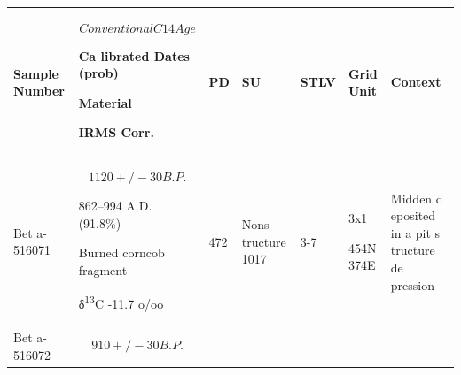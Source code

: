 \documentclass[
  12pt,
]{krantz}
\begin{document}
\begin{longtable}[]{@{}lllllll@{}}
\toprule
\begin{minipage}[b]{0.12\columnwidth}\raggedright
Sample
Number\strut
\end{minipage} & \begin{minipage}[b]{0.12\columnwidth}\raggedright
\[Conv
entional
C14
Age\]

Ca
librated
Dates
(prob)

Material

IRMS
Corr.\strut
\end{minipage} & \begin{minipage}[b]{0.07\columnwidth}\raggedright
PD\strut
\end{minipage} & \begin{minipage}[b]{0.12\columnwidth}\raggedright
SU\strut
\end{minipage} & \begin{minipage}[b]{0.08\columnwidth}\raggedright
STLV\strut
\end{minipage} & \begin{minipage}[b]{0.12\columnwidth}\raggedright
Grid
Unit\strut
\end{minipage} & \begin{minipage}[b]{0.12\columnwidth}\raggedright
Context\strut
\end{minipage}\tabularnewline
\midrule
\endhead
\begin{minipage}[t]{0.12\columnwidth}\raggedright
Bet
a-516071\strut
\end{minipage} & \begin{minipage}[t]{0.12\columnwidth}\raggedright
\[1120
+/- 30
B.P.\]

862--994
A.D.
(91.8\%)

Burned
corncob
fragment

δ\textsuperscript{13}C
-11.7
o/oo\strut
\end{minipage} & \begin{minipage}[t]{0.07\columnwidth}\raggedright
472\strut
\end{minipage} & \begin{minipage}[t]{0.12\columnwidth}\raggedright
Nons
tructure
1017\strut
\end{minipage} & \begin{minipage}[t]{0.08\columnwidth}\raggedright
3-7\strut
\end{minipage} & \begin{minipage}[t]{0.12\columnwidth}\raggedright
3x1

454N
374E\strut
\end{minipage} & \begin{minipage}[t]{0.12\columnwidth}\raggedright
Midden
d
eposited
in a pit
s
tructure
de
pression\strut
\end{minipage}\tabularnewline
\begin{minipage}[t]{0.12\columnwidth}\raggedright
Bet
a-516072\strut
\end{minipage} & \begin{minipage}[t]{0.12\columnwidth}\raggedright
\[910
+/- 30
B.P.\]


\end{minipage}
\end{longtable}
\end{document}
